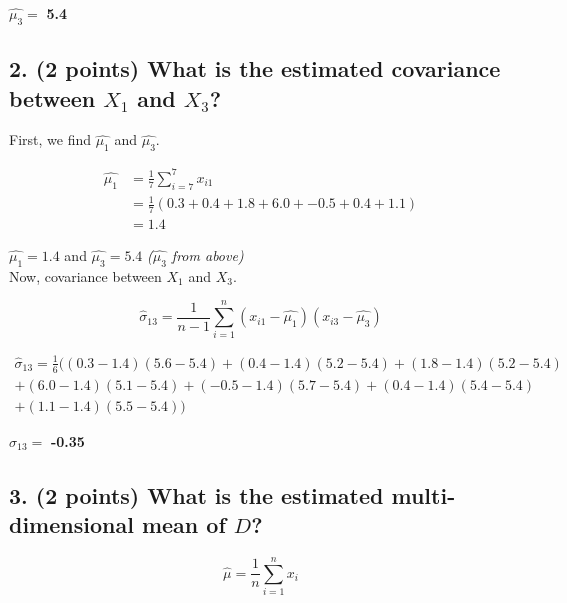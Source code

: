\documentclass[11pt]{article}
\begin{document}
\begin{tcolorbox}[title=Problem 2.1]
    $\hat{\mu_3} = $ \textbf{5.4}
\end{tcolorbox}

\newpage
\subsection*{\textbf{2. (2 points)} What is the estimated covariance between $X_1$ and $X_3$?}

First, we find $\hat{\mu_1}$ and $\hat{\mu_3}$.

\begin{align*}
    \hat{\mu_1} & = \frac{1}{7} \sum_{i=7}^{7} x_{i1} \\
    & = \frac{1}{7}(0.3 + 0.4 + 1.8 + 6.0 + -0.5 + 0.4 + 1.1) \\
    & = 1.4
\end{align*}

$\hat{\mu_1} = 1.4$ and $\hat{\mu_3} = 5.4$ \textit{($\hat{\mu_3}$ from above)} \\

Now, covariance between $X_1$ and $X_3$.

$$\hat{\sigma}_{13} = \frac{1}{n-1}\sum_{i=1}^{n} (x_{i1} - \hat{\mu_1})(x_{i3} - \hat{\mu_3})$$

\begin{multline*}
    \hat{\sigma}_{13} = \frac{1}{6}( 
        (0.3 - 1.4)(5.6 - 5.4)
        + (0.4 - 1.4)(5.2 - 5.4)
        + (1.8 - 1.4)(5.2 - 5.4) \\
        + (6.0 - 1.4)(5.1 - 5.4)
        + (-0.5 - 1.4)(5.7 - 5.4)
        + (0.4 - 1.4)(5.4 - 5.4) \\
        + (1.1 - 1.4)(5.5 - 5.4) )
\end{multline*}

\begin{tcolorbox}[title=Problem 2.2]
    $\hat{\sigma}_{13} = $ \textbf{-0.35}
\end{tcolorbox}

\subsection*{\textbf{3. (2 points)} What is the estimated multi-dimensional mean of $D$?}

$$\hat{\mu} = \frac{1}{n} \sum_{i=1}^{n} x_{i}$$
\end{document}
